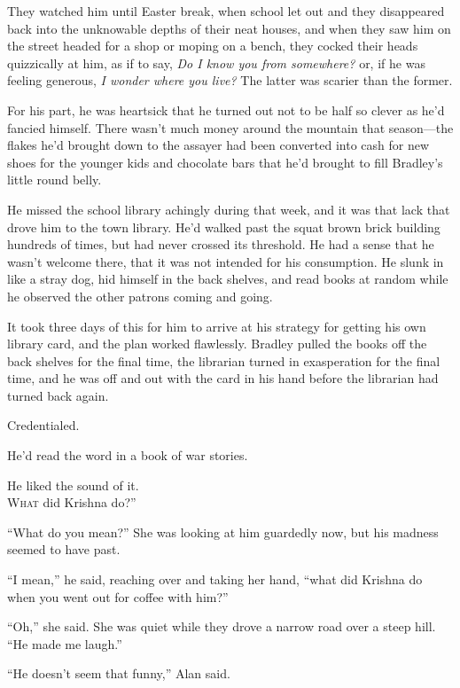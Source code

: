 \documentclass{article}
\begin{document}
They watched him until Easter break, when school let out and they
disappeared back into the unknowable depths of their neat houses, and
when they saw him on the street headed for a shop or moping on a
bench, they cocked their heads quizzically at him, as if to say,
\textit{Do I know you from somewhere?} or, if he was feeling generous,
\textit{I wonder where you live?} The latter was scarier than the
former.

For his part, he was heartsick that he turned out not to be half so
clever as he'd fancied himself.  There wasn't much money around the
mountain that season---the flakes he'd brought down to the assayer had
been converted into cash for new shoes for the younger kids and
chocolate bars that he'd brought to fill Bradley's little round belly.

He missed the school library achingly during that week, and it was
that lack that drove him to the town library.  He'd walked past the
squat brown brick building hundreds of times, but had never crossed
its threshold.  He had a sense that he wasn't welcome there, that it
was not intended for his consumption.  He slunk in like a stray dog,
hid himself in the back shelves, and read books at random while he
observed the other patrons coming and going.

It took three days of this for him to arrive at his strategy for
getting his own library card, and the plan worked flawlessly.  Bradley
pulled the books off the back shelves for the final time, the
librarian turned in exasperation for the final time, and he was off
and out with the card in his hand before the librarian had turned back
again.

Credentialed.

He'd read the word in a book of war stories.

He liked the sound of it.
\\
\lettrine[lines=3, lhang=.5, nindent=0pt, findent=2pt]{W}{hat}
did Krishna do?''

``What do you mean?'' She was looking at him guardedly now, but his
madness seemed to have past.

``I mean,'' he said, reaching over and taking her hand, ``what did
Krishna do when you went out for coffee with him?''

``Oh,'' she said.  She was quiet while they drove a narrow road over a
steep hill.  ``He made me laugh.''

``He doesn't seem that funny,'' Alan said.
\end{document}
